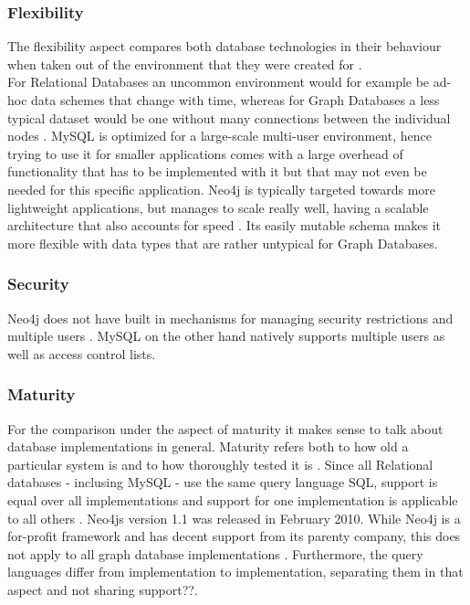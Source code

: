 \subsubsection{Flexibility}
The flexibility aspect compares both database technologies in their behaviour when taken out of the environment that they were created for \autocite{Vicknair2010}. \\
For Relational Databases an uncommon environment would for example be ad-hoc data schemes that change with time, whereas for Graph Databases a less typical dataset would be one without many connections between the individual nodes  \autocite{GarimaAnalysis}.
MySQL is optimized for a large-scale multi-user environment, hence trying to use it for smaller applications comes with a large overhead of functionality that has to be implemented with it but that may not even be needed for this specific application.
Neo4j is typically targeted towards more lightweight applications, but manages to scale really well, having a scalable architecture that also accounts for speed \autocite{neo4jweb}. Its easily mutable schema makes it more flexible with data types that are rather untypical for Graph Databases.

\subsubsection{Security}
Neo4j does not have built in mechanisms for managing security restrictions and multiple users \autocite{GarimaAnalysis}. MySQL on the other hand natively supports multiple users as well as access control lists. \autocite{mysqlsecurity}

\subsubsection{Maturity}
For the comparison under the aspect of maturity it makes sense to talk about database implementations in general. Maturity refers both to how old a particular system is and to how thoroughly tested it is \autocite{Vicknair2010}.
Since all Relational databases - inclusing MySQL - use the same query language SQL, support is equal over all implementations and support for one implementation is applicable to all others \autocite{GarimaAnalysis}.
Neo4js version 1.1 was released in February 2010. While Neo4j is a for-profit framework and has decent support from its parenty company, this does not apply to all graph database implementations \autocite{Vicknair2010}. Furthermore, the query languages differ from implementation to implementation, separating them in that aspect and not sharing support??.


